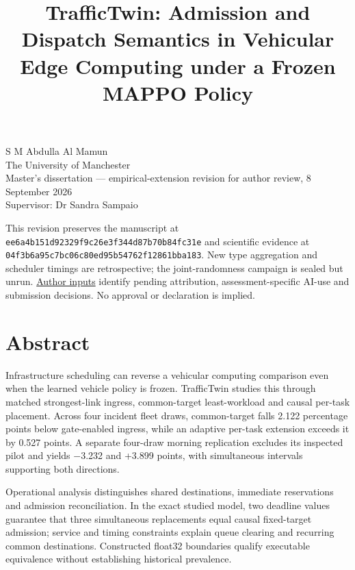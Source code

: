 \documentclass[11pt,a4paper]{article}
\title{TrafficTwin: Admission and Dispatch Semantics in Vehicular Edge Computing under a Frozen MAPPO Policy}
\author{}
\date{}
\begin{document}
\maketitle
S M Abdulla Al Mamun\\
The University of Manchester\\
Master's dissertation --- empirical-extension revision for author review, 8 September 2026\\
Supervisor: Dr Sandra Sampaio

This revision preserves the manuscript at \texttt{ee6a4b151d92329f9c26e3f344d87b70b84fc31e} and scientific evidence at \texttt{04f3b6a95c7bc06c80ed95b54762f12861bba183}. New type aggregation and scheduler timings are retrospective; the joint-randomness campaign is sealed but unrun. \href{\detokenize{../empirical_extension_2026-09-08/AUTHOR_INPUTS.md}}{Author inputs} identify pending attribution, assessment-specific AI-use and submission decisions. No approval or declaration is implied.

\section*{Abstract}\label{sec:abstract}

Infrastructure scheduling can reverse a vehicular computing comparison even when the learned vehicle policy is frozen. TrafficTwin studies this through matched strongest-link ingress, common-target least-workload and causal per-task placement. Across four incident fleet draws, common-target falls 2.122 percentage points below gate-enabled ingress, while an adaptive per-task extension exceeds it by 0.527 points. A separate four-draw morning replication excludes its inspected pilot and yields \ensuremath{-}3.232 and +3.899 points, with simultaneous intervals supporting both directions.

Operational analysis distinguishes shared destinations, immediate reservations and admission reconciliation. In the exact studied model, two deadline values guarantee that three simultaneous replacements equal causal fixed-target admission; service and timing constraints explain queue clearing and recurring common destinations. Constructed float32 boundaries qualify executable equivalence without establishing historical prevalence.
\end{document}
